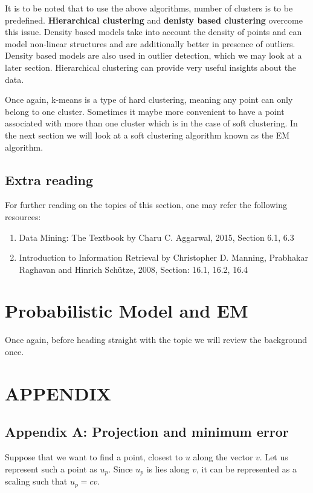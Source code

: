 \documentclass[12pt,a4paper]{article}
\begin{document}
It is to be noted that to use the above algorithms, number of clusters is to be predefined. \textbf{Hierarchical clustering} and \textbf{denisty based clustering} overcome this issue. Density based models take into account the density of points and can model non-linear structures and are additionally better in presence of outliers. Density based models are also used in outlier detection, which we may look at a later section. Hierarchical clustering can provide very useful insights about the data.


Once again, k-means is a type of hard clustering, meaning any point can only belong to one cluster. Sometimes it maybe more convenient to have a point associated with more than one cluster which is in the case of soft clustering. In the next section we will look at a soft clustering algorithm known as the EM algorithm.

\subsection{Extra reading}
For further reading on the topics of this section, one may refer the following resources:
\begin{enumerate}
    \item Data Mining: The Textbook by Charu C. Aggarwal, 2015, Section 6.1, 6.3
    \item Introduction to Information Retrieval by Christopher D. Manning, Prabhakar Raghavan and Hinrich Schütze, 2008, Section: 16.1, 16.2, 16.4
\end{enumerate}

\newpage
\section{Probabilistic Model and EM}
Once again, before heading straight with the topic we will review the background once. 




\newpage
\section{APPENDIX}
\subsection{Appendix A: Projection and minimum error}
Suppose that we want to find a point, closest to $u$ along the vector $v$. Let us represent such a point as $u_p$. Since $u_p$ is lies along $v$, it can be represented as a scaling such that $u_p= cv$. 
\end{document}

